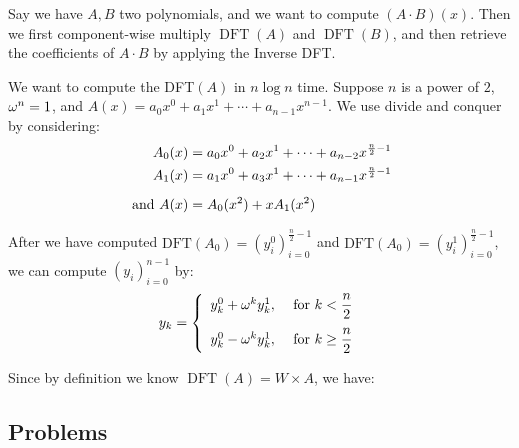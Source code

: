     \begin{algo} Say we have $A, B$ two
        polynomials, and we want to compute $(A\cdot B)(x)$. Then we first
        component-wise multiply $ \operatorname{DFT}(A) $ and $
        \operatorname{DFT}(B) $, and then retrieve the coefficients of $ A\cdot B
    $ by applying the Inverse DFT.  \end{algo}


    \begin{algo} We want to compute the DFT$ (A) $ in $
        n\log n $ time. Suppose $ n $ is a power of $ 2 $, $ \omega^n = 1 $, and $
        A(x) = a_{0} x^{0}+a_{1} x^{1}+\cdots+a_{n-1} x^{n-1} $. We use divide and
        conquer by considering: \begin{align*} A_{0}(x)&=a_{0} x^{0}+a_{2}
            x^{1}+\cdots+a_{n-2} x^{\frac{n}{2}-1} \\ A_{1}(x)&=a_{1} x^{0}+a_{3}
            x^{1}+\cdots+a_{n-1} x^{\frac{n}{2}-1}\\[.5em] \text{ and } A(x) &= A_0(x^2) +
        xA_1(x^2) \end{align*}

        After we have computed $ \text{DFT}(A_0) = (y^0_i)^{\frac{n}{2} - 1}_{i=0}
        $ and $ \text{DFT}(A_0) = (y^1_i)^{\frac{n}{2} - 1}_{i=0} $, we can
        compute $ (y_i)^{n-1}_{i=0} $ by: \[ y_k = \left\{ \begin{array}{ll} y^0_k
                + \omega^ky^1_k, &\text{ for } k < \dfrac{n}{2}\\[1em] y^0_k -
        \omega^ky^1_k, &\text{ for } k \ge \dfrac{n}{2} \end{array} \right.  \]
    \end{algo}

    \begin{algo} Since by definition we know $ \operatorname{DFT}(A)
    = W\times A $, we have: \end{algo}


    \newpage\subsection{Problems}




